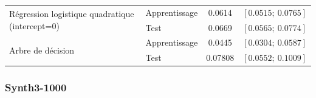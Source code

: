 \documentclass{article}
\begin{document}
\begin{table}[H]
\begin{tabular}{l|l|cc}
\multirow{2}{*}{Régression logistique quadratique (intercept=0)}                  & Apprentissage    & 0.0614                             & $\left[0.0515 ;~ 0.0765\right]$  \\
                                       & Test             & 0.0669                                 & $\left[0.0565 ;~ 0.0774 \right]$ \\ \hline      
\multirow{2}{*}{Arbre de décision}                  & Apprentissage    & 0.0445                             & $\left[0.0304 ;~ 0.0587 \right]$  \\
                                       & Test             & 0.07808                                & $\left[0.0552 ;~ 0.1009 \right]$ 
\end{tabular}


\label{err_2-1000}
\end{table}









\subsubsection{Synth3-1000}
\end{document}
